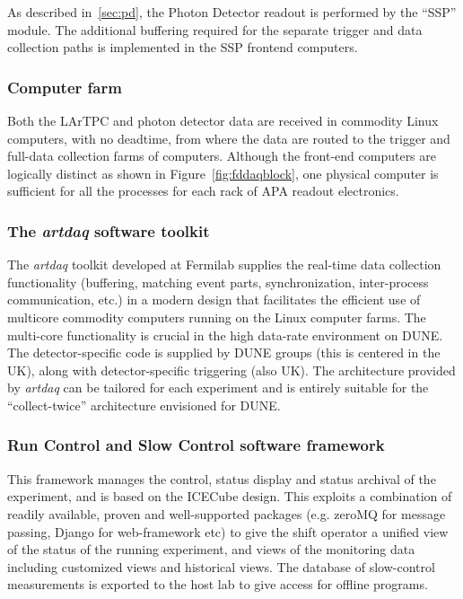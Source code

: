 As described in~\ref{sec:pd}, the Photon Detector readout  is performed by the ``SSP'' module.
 The additional buffering required for the separate trigger and data collection paths
is implemented in the SSP frontend computers.

\subsubsection{Computer farm}
Both the LArTPC and photon detector data are
received in commodity Linux computers, with no deadtime, from where
the data are routed to the trigger and full-data collection farms of
computers.  Although the front-end computers are logically distinct as
shown in Figure~\ref{fig:fddaqblock}, one physical computer is
sufficient for all the processes for each rack of APA readout
electronics. 

\subsubsection{The \textit{artdaq} software toolkit}

The \textit{artdaq} toolkit developed at  Fermilab supplies the real-time
data collection functionality (buffering, matching event parts,
synchronization, inter-process communication, etc.) in a modern
design that facilitates the efficient use of multicore commodity
computers running on the Linux computer farms.  The multi-core
functionality is crucial in the high data-rate environment on DUNE.  
The detector-specific code is supplied by DUNE groups (this is centered in the UK),
along with detector-specific triggering (also UK).  The architecture
provided by \textit{artdaq} can be tailored for each experiment and is entirely
suitable for the ``collect-twice'' architecture envisioned for DUNE.

\subsubsection{Run Control and Slow Control software framework}

This framework manages the control, status display and status archival of the experiment,
and is based on the ICECube design.  This exploits a combination of readily available, proven and
well-supported packages (e.g. zeroMQ for message passing, Django for web-framework etc) 
to give the shift operator a unified view of the status
of the running experiment, and views of the monitoring data including
customized views and historical views.  The database of slow-control
measurements is exported to the host lab to give access for offline
programs.

